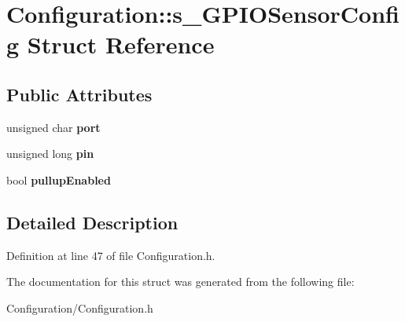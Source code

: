\section{Configuration\+:\+:s\+\_\+\+G\+P\+I\+O\+Sensor\+Config Struct Reference}
\label{struct_configuration_1_1s___g_p_i_o_sensor_config}
\subsection*{Public Attributes}
\begin{DoxyCompactItemize}
\item 
unsigned char {\bfseries port}\label{struct_configuration_1_1s___g_p_i_o_sensor_config_a7eb39dd54bc5fb779bbb3443cd081445}

\item 
unsigned long {\bfseries pin}\label{struct_configuration_1_1s___g_p_i_o_sensor_config_a4d8049afce891185302c916659c90d33}

\item 
bool {\bfseries pullup\+Enabled}\label{struct_configuration_1_1s___g_p_i_o_sensor_config_abe520fc155dff35bdef9cfa10e085a2b}

\end{DoxyCompactItemize}


\subsection{Detailed Description}


Definition at line 47 of file Configuration.\+h.



The documentation for this struct was generated from the following file\+:\begin{DoxyCompactItemize}
\item 
Configuration/Configuration.\+h\end{DoxyCompactItemize}
